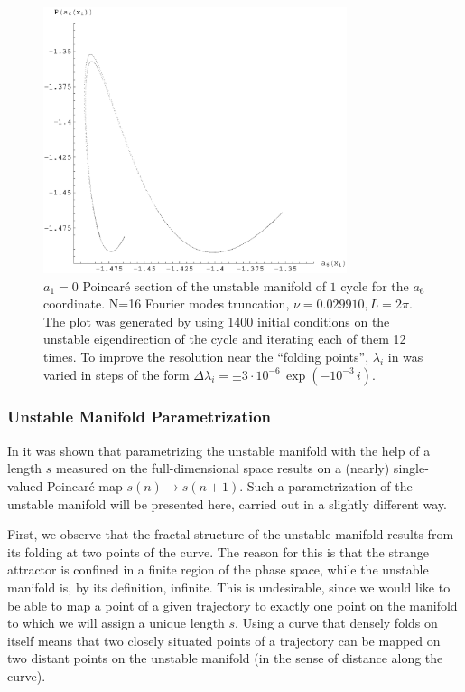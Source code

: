 \documentclass[pre,preprint,groupedaddress,showpacs,showkeys]{revtex4}
\begin{document}
 \begin{figure}[b!]
     \includegraphics[width=3.5in]{figs/manifold.eps}
     \caption{ $a_1=0$ Poincar\'e section of the unstable manifold of $ \overline{1}$   cycle  for the $a_6$ coordinate.
     N=16 Fourier modes truncation, $\nu=0.029910, L=2\pi$. The
     plot was generated by using 1400 initial conditions on the
     unstable eigendirection of the cycle and iterating each of them
     12 times. To improve the resolution near the ``folding points'',
     $\lambda_i$ in  was varied in
     steps of the form $\Delta\lambda_i=\pm 3\cdot 10^{-6}\, \exp(-10^{-3}\,i)$.
     }
 \label{fig:Manifold}
 \end{figure}



 \subsubsection{Unstable Manifold Parametrization}

  In \cite{Christiansen:97} it was shown that parametrizing the unstable manifold with
  the help of a length $s$ measured on the full-dimensional space
  results on a (nearly) single-valued Poincar\'e map   $s(n) \rightarrow
  s(n+1)$. Such a parametrization of the
  unstable manifold will be presented here, carried out in a slightly
  different way.

  First, we observe that the fractal structure of the unstable
  manifold results from its folding at two points of the curve. The
  reason for this is that the strange attractor is confined in a
  finite region of the phase space, while the unstable manifold is, by
  its definition, infinite.
  This is undesirable, since we would like to be able to map a
  point of a given trajectory to exactly one point on the manifold to
  which we will assign a unique length $s$. Using a curve that densely
  folds on itself means that two closely situated points of a
  trajectory can be mapped on two distant points on the unstable
  manifold (in the sense of distance along the curve).
\end{document}
